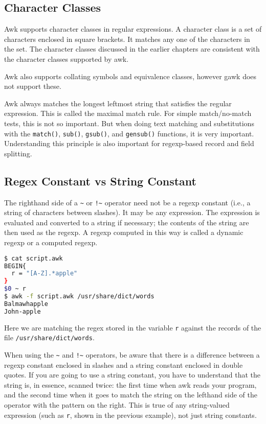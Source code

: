 \subsection{Character Classes}

Awk supports character classes in regular expressions. A character class is a set of characters enclosed in square brackets. It matches any one of the characters in the set.
The character classes discussed in the earlier chapters are consistent with the character classes supported by awk.

\begin{remark}
  Awk also supports collating symbols and equivalence classes, however gawk does not support these.
\end{remark}

Awk always matches the longest leftmost string that satisfies the regular expression. This is called the maximal match rule.
For simple match/no-match tests, this is not so important. But when doing text matching and substitutions with the \lstinline|match()|, \lstinline|sub()|, \lstinline|gsub()|, and \lstinline|gensub()| functions, it is very important. Understanding this principle is also important for regexp-based record and field splitting.


\subsection{Regex Constant vs String Constant}

The righthand side of a \lstinline|~| or \lstinline|!~| operator need not be a regexp constant (i.e., a string of characters between slashes). It may be any expression. The expression is evaluated and converted to a string if necessary; the contents of the string are then used as the regexp. A regexp computed in this way is called a dynamic regexp or a computed regexp.

\begin{lstlisting}[language=bash]
$ cat script.awk
BEGIN{
  r = "[A-Z].*apple"
}
$0 ~ r
$ awk -f script.awk /usr/share/dict/words
Balmawhapple
John-apple
\end{lstlisting}

Here we are matching the regex stored in the variable \lstinline|r| against the records of the file \lstinline|/usr/share/dict/words|.

\begin{remark}
When using the \lstinline|~| and \lstinline|!~| operators, be aware that there is a difference between a regexp constant enclosed in slashes and a string constant enclosed in double quotes. If you are going to use a string constant, you have to understand that the string is, in essence, scanned twice: the first time when awk reads your program, and the second time when it goes to match the string on the lefthand side of the operator with the pattern on the right. This is true of any string-valued expression (such as \lstinline|r|, shown in the previous example), not just string constants.
\end{remark}

